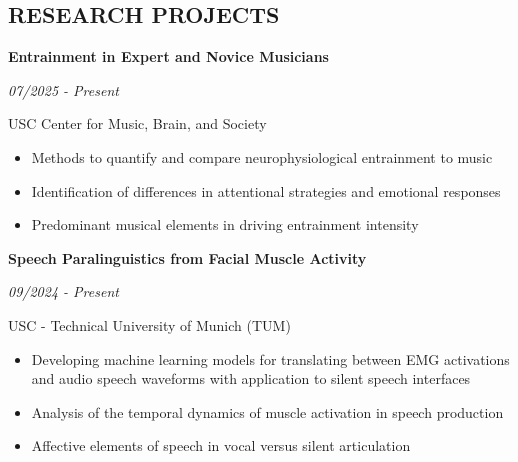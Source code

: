 \documentclass[margin]{res}
\newcommand{\cvheading}[2]{%
  \par\Needspace{4\baselineskip}\noindent
  \parbox[t]{\dimexpr\linewidth-110pt\relax}{\raggedright\bfseries #1}%
  \hfill\parbox[t]{98pt}{\raggedleft\itshape #2}%
  \par\nopagebreak[4]\vspace{-\parskip}\noindent\ignorespaces}
\begin{document}
\begin{resume}
\section{RESEARCH PROJECTS}


\cvheading{Entrainment in Expert and Novice Musicians}{07/2025 - Present}
USC Center for Music, Brain, and Society
\vspace{1mm}
\begin{itemize}
    \item Methods to quantify and compare neurophysiological entrainment to music
    \vspace{-1mm}
    \item Identification of differences in attentional strategies and emotional responses
    \vspace{-1mm}
    \item Predominant musical elements in driving entrainment intensity
\end{itemize}

\cvheading{Speech Paralinguistics from Facial Muscle Activity}{09/2024 - Present}
USC - Technical University of Munich (TUM)
\vspace{1mm}
\begin{itemize}
    \item Developing machine learning models for translating between EMG activations and audio speech waveforms with application to silent speech interfaces
    \vspace{-1mm}
    \item Analysis of the temporal dynamics of muscle activation in speech production
    \vspace{-1mm}
    \item Affective elements of speech in vocal versus silent articulation
\end{itemize}


\end{resume}
\end{document}
